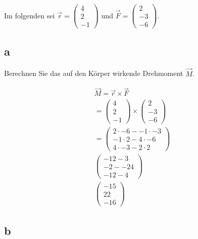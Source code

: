 Im folgenden sei $\vec{r} = \begin{pmatrix}
        4 \\ 2 \\ -1
    \end{pmatrix}$ und $\vec{F} = \begin{pmatrix}
        2 \\ -3 \\ -6
    \end{pmatrix}$.

\subsection{a}
Berechnen Sie das auf den Körper wirkende Drehmoment $\vec{M}$.

\begin{align*}
    \vec{M} = \vec{r} \times \vec{F}      \\
    = \begin{pmatrix}
          4 \\ 2 \\ -1
      \end{pmatrix} \times \begin{pmatrix}
                               2 \\ -3 \\ -6
                           \end{pmatrix} \\
    = \begin{pmatrix}
          2 \cdot -6 - -1 \cdot -3 \\
          -1 \cdot 2 - 4 \cdot -6  \\
          4 \cdot -3 - 2 \cdot 2
      \end{pmatrix}            \\
    \begin{pmatrix}
        -12 - 3  \\
        -2 - -24 \\
        -12 -4
    \end{pmatrix}                        \\
    \begin{pmatrix}
        -15 \\
        22  \\
        -16
    \end{pmatrix}
\end{align*}

\subsection{b}

